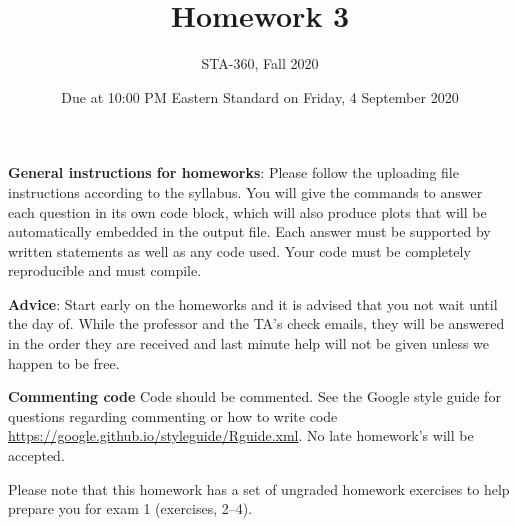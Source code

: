 \documentclass{article}
\begin{document}
\title{Homework 3}
\author{STA-360, Fall 2020}
\date{Due at 10:00 PM Eastern Standard  on Friday, 4 September 2020}
\maketitle

\textbf{General instructions for homeworks}: Please follow the uploading file instructions according to the syllabus. You will give the commands to answer each question in its own code block, which will also produce plots that will be automatically embedded in the output file. Each answer must be supported by written statements as well as any code used. Your code must be completely reproducible and must compile. 

\textbf{Advice}: Start early on the homeworks and it is advised that you not wait until the day of. While the professor and the TA's check emails, they will be answered in the order they are received and last minute help will not be given unless we happen to be free.  

\textbf{Commenting code}
Code should be commented. See the Google style guide for questions regarding commenting or how to write 
code \url{https://google.github.io/styleguide/Rguide.xml}. No late homework's will be accepted.


Please note that this homework has a set of ungraded homework exercises to
help prepare you for exam 1 (exercises, 2--4). 
\end{document}
